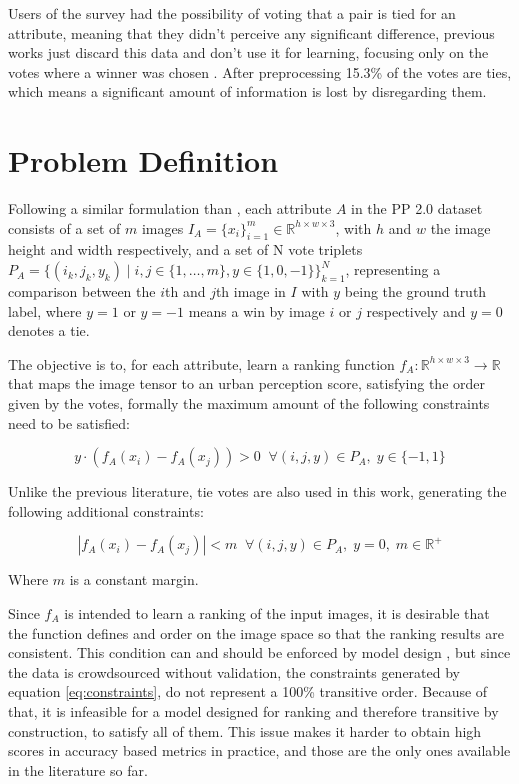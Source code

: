 Users of the survey had the possibility of voting that a pair is tied for an attribute,
meaning that they didn't perceive any significant difference, previous works just
discard this data and don't use it for learning, focusing only on the votes where a winner was
chosen \cite{hidalgo_placepulse,zhang_measuring,tamara_judgments}. After preprocessing 15.3\% of the
votes are ties, which means a significant amount of information is lost by disregarding them.


\section{Problem Definition}

Following a similar formulation than , each attribute $A$ in the PP 2.0 dataset consists of a set
of $m$ images $I_A = \{x_i\}_{i=1}^m \in \mathbb{R}^{h \times w \times 3}$, with $h$ and $w$
the image height and width respectively, and a set of N vote triplets
$P_A=\{(i_k, j_k, y_k) \;|\; i,j \in \{1, \ldots, m \} , y \in \{1,0,-1\}\}_{k=1}^N$, representing a comparison
between the $i$th and $j$th image in $I$ with $y$ being the ground truth label, where $y=1$ or $y=-1$ means a win by image
$i$ or $j$ respectively and  $y=0$ denotes a tie.

The objective is to, for each attribute, learn a ranking function $f_A : \mathbb{R}^{h \times w \times 3} \rightarrow \mathbb{R}$
that maps the image tensor to an urban perception score, satisfying the order given by the votes, formally the
maximum amount of the following constraints need to be satisfied:

\begin{equation}
y \cdot (f_A(x_i) - f_A(x_j)) > 0 \;\; \forall (i,j,y) \in P_A, \; y \in \{-1,1\}
\label{eq:constraints}
\end{equation}

Unlike the previous literature, tie votes are also used in this work, generating the following additional constraints:

\begin{equation}
	|f_A(x_i) - f_A(x_j)| < m \;\; \forall (i,j,y) \in P_A, \; y = 0, \; m \in \mathbb{R}^+
	\label{eq:constraints_ties}
\end{equation}

Where $m$ is a constant margin.

Since $f_A$ is intended to learn a ranking of the input images, it is desirable that the function defines and order
on the image space so that the ranking results are consistent. This condition can and should be enforced by
model design \cite{koppel_pairwise}, but since the data is crowdsourced without
validation, the constraints generated by equation \ref{eq:constraints}, do not represent a  100\% transitive order.
Because of that, it is infeasible for a model designed for ranking and therefore
transitive by construction, to satisfy all of them.
This issue makes it harder to obtain high scores in accuracy based metrics in practice, and
those are the only ones available in the literature so far.
